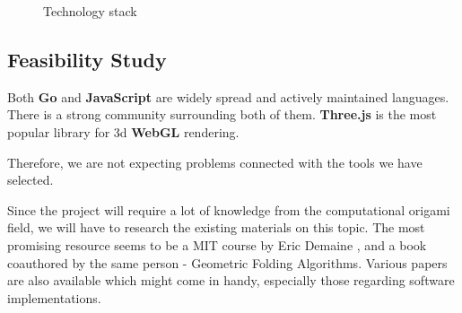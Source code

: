 \begin{figure}[H]
	\caption{Technology stack}
	\centering
\end{figure}


\subsection{Feasibility Study}

Both \textbf{Go} and \textbf{JavaScript} are widely spread and actively maintained languages.
There is a strong community surrounding both of them.
\textbf{Three.js} is the most popular library for 3d \textbf{WebGL} rendering.

Therefore, we are not expecting problems connected with the tools we have selected.

Since the project will require a lot of knowledge from the computational origami
field, we will have to research the existing materials on this topic.
The most promising resource seems to be a MIT course by
Eric Demaine \cite{mit-course}, and a book coauthored by the same person -
Geometric Folding Algorithms\cite{origami-book}.
Various papers are also available which might come in handy, especially those regarding software implementations.


